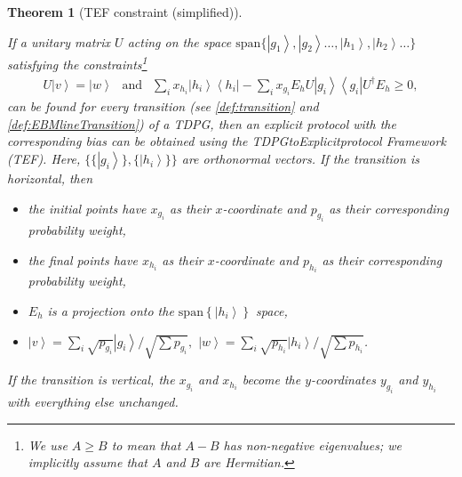 \documentclass{article}
\newtheorem{theorem}{Theorem}\newtheorem{lemma}[theorem]{Lemma}\newtheorem{proposition}[theorem]{Proposition}\newtheorem{corollary}[theorem]{Corollary}\newtheorem{definition}[theorem]{Definition}\newtheorem{claim}[theorem]{Claim}\newtheorem{remark}[theorem]{Remark}\newtheorem{example}[theorem]{Example}
\begin{document}
\begin{theorem}[TEF constraint (simplified)]
  \begin{sloppy}If a unitary matrix $U$ acting on the space $\text{span}\{\left|g_{1}\right\rangle ,\left|g_{2}\right\rangle \dots,\left|h_{1}\right\rangle ,\left|h_{2}\right\rangle \dots\}$
    satisfying the constraints\footnote{We use $A\ge B$ to mean that $A-B$ has non-negative
      eigenvalues; we implicitly assume that $A$ and $B$ are Hermitian.}
    \begin{align}
      U\left|v\right\rangle =\left|w\right\rangle \ \ \text{ and }\ \
      \sum_{i}x_{h_{i}}\left|h_{i}\right\rangle \left\langle h_{i}\right|-\sum_{i}x_{g_{i}}E_{h}U\left|g_{i}\right\rangle \left\langle g_{i}\right|U^{\dagger}E_{h}\ge0,\label{eq:constraint}
    \end{align}
    can be found for every transition (see \cref{def:transition} and \cref{def:EBMlineTransition})
    of a TDPG, then an explicit protocol with the corresponding bias can
    be obtained using the TDPG\textendash to\textendash Explicit\textendash protocol
    Framework (TEF). Here, $\{\{\left|g_{i}\right\rangle \},\{\left|h_{i}\right\rangle \}\}$
    are orthonormal vectors. If the transition is horizontal, then
    \begin{itemize}
      \item the initial points have $x_{g_{i}}$ as their $x$-coordinate and
            $p_{g_{i}}$ as their corresponding probability weight,
      \item the final points have $x_{h_{i}}$ as their $x$-coordinate
            and $p_{h_{i}}$ as their corresponding probability weight,
      \item $E_{h}$ is a projection onto the $\text{span}\left\{ \left|h_{i}\right\rangle \right\} $
            space,
      \item $\left|v\right\rangle =\sum_{i}\sqrt{p_{g_{i}}}\left|g_{i}\right\rangle /\sqrt{\sum p_{g_{i}}},$
            $\left|w\right\rangle =\sum_{i}\sqrt{p_{h_{i}}}\left|h_{i}\right\rangle /\sqrt{\sum p_{h_{i}}}$.
    \end{itemize}
    If the transition is vertical, the $x_{g_{i}}$ and $x_{h_{i}}$
    become the $y$-coordinates $y_{g_{i}}$ and $y_{h_{i}}$ with everything
    else unchanged.\label{thm:TEFconstraint-inf}\end{sloppy}
\end{theorem}
\end{document}
